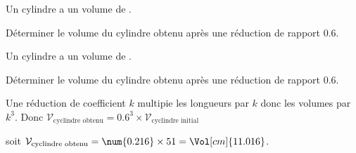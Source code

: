 \begin{exercice*}
    Un cylindre a un volume de .

    Déterminer le volume du cylindre obtenu après une réduction de rapport \num{0.6}.
\end{exercice*}
\begin{corrige}
    Un cylindre a un volume de .

    Déterminer le volume du cylindre obtenu après une réduction de rapport \num{0.6}.

    {\color{red}Une réduction de coefficient $k$ multipie les longueurs par $k$ donc les volumes par $k^3$.
    Donc $\mathcal{V}_{\text{cyclindre obtenu}}=\num{0.6}^3\times\mathcal{V}_{\text{cyclindre initial}}$

    soit $\mathcal{V}_{\text{cyclindre obtenu}}=\num{0.216}\times 51=\Vol[cm]{11.016}$.
    }
\end{corrige}
